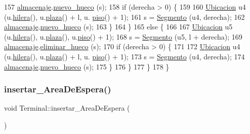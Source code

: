\begin{DoxyCode}
157             \hyperlink{class_terminal_a1d87d7b16c4f460eee6f1ab73da90fd2}{almacenaje}.\hyperlink{class_almacenaje_ac98f7d262897f33ece29a432e111f02c}{nuevo\_hueco} (s);
158             \textcolor{keywordflow}{if} (derecha > 0) \{
159             
160                 \hyperlink{class_ubicacion}{Ubicacion} u4 (u.\hyperlink{class_ubicacion_abf00d08075e75ac833de7357ebc6f521}{hilera}(), u.\hyperlink{class_ubicacion_abed323ffb2eace375e80bc395fdaeb39}{plaza}() + l, u.
      \hyperlink{class_ubicacion_af6099f8de4dee993e4c9119e1f879070}{piso}() + 1);
161                 s = \hyperlink{class_segmento}{Segmento} (u4, derecha);
162                 \hyperlink{class_terminal_a1d87d7b16c4f460eee6f1ab73da90fd2}{almacenaje}.\hyperlink{class_almacenaje_ac98f7d262897f33ece29a432e111f02c}{nuevo\_hueco} (s);
163             \}
164         \}
165         \textcolor{keywordflow}{else} \{
166         
167             \hyperlink{class_ubicacion}{Ubicacion} u5 (u.\hyperlink{class_ubicacion_abf00d08075e75ac833de7357ebc6f521}{hilera}(), u.\hyperlink{class_ubicacion_abed323ffb2eace375e80bc395fdaeb39}{plaza}(), u.\hyperlink{class_ubicacion_af6099f8de4dee993e4c9119e1f879070}{piso}() + 1);
168             s = \hyperlink{class_segmento}{Segmento} (u5, l + derecha);
169             \hyperlink{class_terminal_a1d87d7b16c4f460eee6f1ab73da90fd2}{almacenaje}.\hyperlink{class_almacenaje_a20219014a2d5bf325df7245cd0822277}{eliminar\_hueco} (s);
170             \textcolor{keywordflow}{if} (derecha > 0) \{
171             
172                 \hyperlink{class_ubicacion}{Ubicacion} u4 (u.\hyperlink{class_ubicacion_abf00d08075e75ac833de7357ebc6f521}{hilera}(), u.\hyperlink{class_ubicacion_abed323ffb2eace375e80bc395fdaeb39}{plaza}() + l, u.
      \hyperlink{class_ubicacion_af6099f8de4dee993e4c9119e1f879070}{piso}() + 1);
173                 s = \hyperlink{class_segmento}{Segmento} (u4, derecha);
174                 \hyperlink{class_terminal_a1d87d7b16c4f460eee6f1ab73da90fd2}{almacenaje}.\hyperlink{class_almacenaje_ac98f7d262897f33ece29a432e111f02c}{nuevo\_hueco} (s);
175             \}
176         \}
177     \}
178 \}
\end{DoxyCode}
\mbox{\label{class_terminal_a672932def16149bd23a95d60956e42a0}} 
\subsubsection{\texorpdfstring{insertar\+\_\+\+Area\+De\+Espera()}{insertar\_AreaDeEspera()}}
{\footnotesize\ttfamily void Terminal\+::insertar\+\_\+\+Area\+De\+Espera (\begin{DoxyParamCaption}{ }\end{DoxyParamCaption})}



